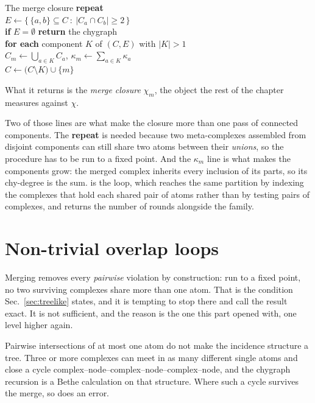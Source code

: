 \begin{model}{The merge closure}
\small
\textbf{repeat}\\
\hspace*{1.1em}$E\leftarrow\bigl\{\,\{a,b\}\subseteq C\ :\
  |C_{a}\cap C_{b}|\ge2\,\bigr\}$\\
\hspace*{1.1em}\textbf{if} $E=\emptyset$ \textbf{return} the chygraph\\
\hspace*{1.1em}\textbf{for each} component $K$ of $(C,E)$ with $|K|>1$\\
\hspace*{2.2em}$C_{m}\leftarrow\bigcup_{a\in K}C_{a}$,\qquad
  $\kappa_{m}\leftarrow\sum_{a\in K}\kappa_{a}$\\
\hspace*{2.2em}$C\leftarrow\bigl(C\setminus K\bigr)\cup\{m\}$
\end{model}

\noindent
What it returns is the \emph{merge closure} $\chi_{m}$, the object the rest of
the chapter measures against $\chi$.

Two of those lines are what make the closure more than one pass of connected
components. The \textbf{repeat} is needed because two meta-complexes assembled
from disjoint components can still share two atoms between their
\emph{unions}, so the procedure has to be run to a fixed point. And the
$\kappa_{m}$ line is what makes the components grow: the merged complex
inherits every inclusion of its parts, so its chy-degree is the sum.
 is the
loop, which reaches the same partition by indexing the complexes that hold each
shared pair of atoms rather than by testing pairs of complexes, and returns the
number of rounds alongside the family.

\section{Non-trivial overlap loops}
\label{sec:mergeerror}

Merging removes every \emph{pairwise} violation by construction: run to a fixed
point, no two surviving complexes share more than one atom. That is the
condition Sec.~\ref{sec:treelike} states, and it is tempting to stop there and
call the result exact. It is not sufficient, and the reason is the one this part
opened with, one level higher again.

Pairwise intersections of at most one atom do not make the incidence structure a
tree. Three or more complexes can meet in as many different single atoms and
close a cycle complex--node--complex--node--complex--node, and the chygraph
recursion is a Bethe calculation on that structure. Where such a cycle survives
the merge, so does an error.

